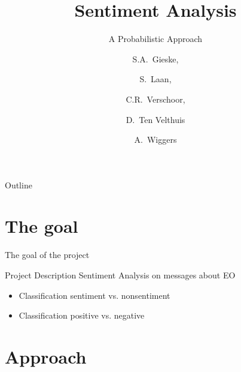 \documentclass{beamer}
\title[Leren en Beslissen - Sentiment Analisys]
{Sentiment Analysis}
\subtitle{A Probabilistic Approach}
\author[Gieske, Laan, Verschoor, ten Velthuis, Wiggers ] %
{S.A.~Gieske, \and S.~Laan, \and C.R.~Verschoor, \\
\and D.~Ten Velthuis \and A.~Wiggers}
\institute[University of Amsterdam] %
{
  Faculty of Science (FNWI) \\
  University of Amsterdam
  }
\begin{document}
\begin{frame}
  \titlepage
\end{frame}

\begin{frame}{Outline}
  \tableofcontents
\end{frame}


\section{The goal}

\begin{frame}{The goal of the project}
\begin{block}{Project Description}
Sentiment Analysis on messages about EO
\end{block}
\begin{itemize}
\item Classification sentiment vs. nonsentiment
\item Classification positive vs. negative
\end{itemize}
\end{frame}

\section{Approach}
\end{document}
